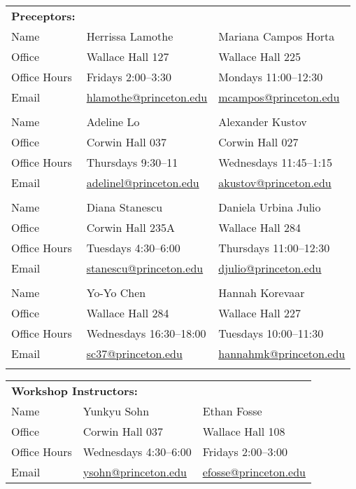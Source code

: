 \documentclass[11pt]{article}
\begin{document}
\noindent
\begin{tabular}{lp{2in}p{2in}}
   \textbf{Preceptors:}\\
  {\sc Name} & Herrissa Lamothe & Mariana Campos Horta \\
  {\sc Office} & Wallace Hall 127 & Wallace Hall 225 \\
  {\sc Office Hours} & Fridays 2:00--3:30 & Mondays 11:00--12:30 \\
  {\sc Email} & \href{mailto:hlamothe@princeton.edu}{hlamothe@princeton.edu} & \href{mcampos@princeton.edu}{mcampos@princeton.edu} \\
  \\
  {\sc Name} & Adeline Lo & Alexander Kustov \\
  {\sc Office} & Corwin Hall 037 & Corwin Hall 027 \\
  {\sc Office Hours} & Thursdays 9:30--11 & Wednesdays 11:45--1:15 \\
  {\sc Email} & \href{adelinel@princeton.edu}{adelinel@princeton.edu} & \href{akustov@princeton.edu}{akustov@princeton.edu} \\
  \\ 
  {\sc Name} & Diana Stanescu & Daniela Urbina Julio \\
  {\sc Office} & Corwin Hall 235A & Wallace Hall 284 \\
  {\sc Office Hours} & Tuesdays 4:30--6:00 & Thursdays 11:00--12:30 \\
  {\sc Email} & \href{stanescu@princeton.edu}{stanescu@princeton.edu} & \href{djulio@princeton.edu}{djulio@princeton.edu} \\
  \\
  {\sc Name} & Yo-Yo Chen & Hannah Korevaar \\
  {\sc Office} & Wallace Hall 284 & Wallace Hall 227 \\
  {\sc Office Hours} & Wednesdays 16:30--18:00 & Tuesdays 10:00--11:30 \\
  {\sc Email} & \href{sc37@princeton.edu}{sc37@princeton.edu} & \href{hannahmk@princeton.edu}{hannahmk@princeton.edu} \\
  \\

\end{tabular}
\vspace{5mm}

\noindent 
\begin{tabular}{lp{1.5in}p{1.5in}}
  \multicolumn{2}{l}{\textbf{Workshop Instructors:}}\\
  {\sc Name} & Yunkyu Sohn &  Ethan Fosse \\
  {\sc Office} & Corwin Hall 037 & Wallace Hall 108  \\
  {\sc Office Hours} & Wednesdays 4:30--6:00 & Fridays 2:00--3:00 \\
  {\sc Email} & \href{mailto:ysohn@princeton.edu}{ysohn@princeton.edu}  & \href{mailto:efosse@princeton.edu}{efosse@princeton.edu} \\
\end{tabular}
\vspace{5mm}
\end{document}

